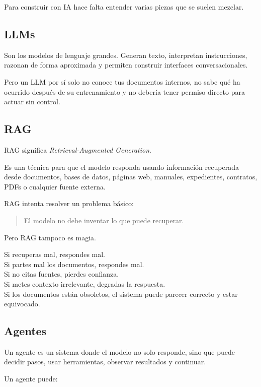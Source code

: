 Para construir con IA hace falta entender varias piezas que se suelen
mezclar.

\subsection{LLMs}\label{llms}

Son los modelos de lenguaje grandes. Generan texto, interpretan
instrucciones, razonan de forma aproximada y permiten construir
interfaces conversacionales.

Pero un LLM por sí solo no conoce tus documentos internos, no sabe qué
ha ocurrido después de su entrenamiento y no debería tener permiso
directo para actuar sin control.

\subsection{RAG}\label{rag}

RAG significa \emph{Retrieval-Augmented Generation}.

Es una técnica para que el modelo responda usando información recuperada
desde documentos, bases de datos, páginas web, manuales, expedientes,
contratos, PDFs o cualquier fuente externa.

RAG intenta resolver un problema básico:

\begin{quote}
El modelo no debe inventar lo que puede recuperar.
\end{quote}

Pero RAG tampoco es magia.

Si recuperas mal, respondes mal.\\
Si partes mal los documentos, respondes mal.\\
Si no citas fuentes, pierdes confianza.\\
Si metes contexto irrelevante, degradas la respuesta.\\
Si los documentos están obsoletos, el sistema puede parecer correcto y
estar equivocado.

\subsection{Agentes}\label{agentes}

Un agente es un sistema donde el modelo no solo responde, sino que puede
decidir pasos, usar herramientas, observar resultados y continuar.

Un agente puede:

